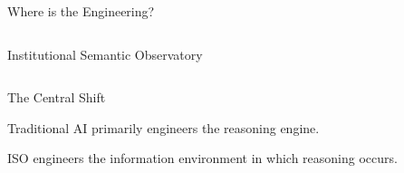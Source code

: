 \documentclass[aspectratio=169]{beamer}
\begin{document}
\begin{frame}{Where is the Engineering?}
\begin{columns}[T]
\begin{block}{Institutional Semantic Observatory}
\end{block}

\end{columns}

\vspace{0.45cm}

\begin{alertblock}{The Central Shift}

Traditional AI primarily engineers the reasoning engine.

ISO engineers the information environment in which reasoning occurs.

\end{alertblock}

\end{frame}


%
%

%
%
\end{document}
